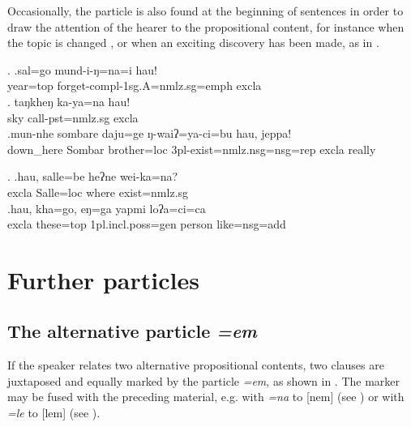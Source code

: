 Occasionally, the particle is also found at the beginning of sentences in order to draw the attention of the hearer to the propositional content, for instance when the topic is changed \NNext[a], or when an exciting discovery has been made, as in \NNext[b].

\ex. \ag.sal=go     mund-i-ŋ=na=i    hau!\\
year{\sc =top} forget{\sc -compl-1sg.A=nmlz.sg=emph} {\sc excla}\\
\bg. taŋkheŋ ka-ya=na              hau!\\
sky call{\sc [3sg]-pst=nmlz.sg} {\sc excla}\\
\bg.mun-nhe    sombare  daju=ge            ŋ-waiʔ=ya-ci=bu hau,                   jeppa!  \\
down\_here Sombar brother{\sc =loc} {\sc 3pl-}exist{\sc =nmlz.nsg=nsg=rep} {\sc excla} really \\

 \ex. \ag.hau,  salle=be        heʔne wei-ka=na?\\
 {\sc excla} Salle{\sc =loc} where exist{=nmlz.sg}\\
 \bg.hau,  kha=go, eŋ=ga  yapmi  loʔa=ci=ca\\
 {\sc excla} these{\sc =top} {\sc 1pl.incl.poss=gen} person like{\sc =nsg=add}\\
 
\section{Further particles}\label{ptcl-further}
\subsection{The alternative particle \emph{=em}}\label{ptcl-alt}

If the speaker relates two alternative propositional contents, two clauses are juxtaposed and equally marked by the particle \emph{=em}, as shown in \Next. The marker may be fused with the preceding material, e.g. with  \emph{=na} to [nem] (see \Next[c]) or with \emph{=le} to [lem] (see \NNext[a]).

